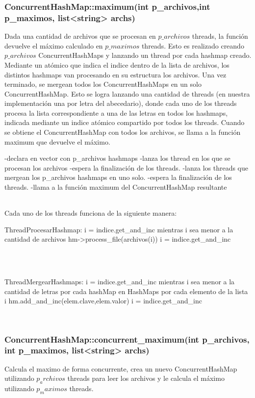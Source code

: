 \subsubsection{ConcurrentHashMap::maximum(int p\_archivos,int p_maximos,
 list<string> archs)}
Dada una cantidad de archivos que se procesan en $p\_archivos$ threads, la función devuelve el máximo calculado en $p\_maximos$ threads.
Esto es realizado creando $p\_archivos$ ConcurrentHashMaps y lanzando un thread por cada hashmap creado.
Mediante un atómico que indica el indice dentro de la lista de archivos, los distintos hashmaps van procesando en su estructura los archivos.
Una vez terminado, se mergean todos los ConcurrentHashMaps en un solo ConcurrentHashMap. Esto se logra lanzando una cantidad de threads (en nuestra implementación una por letra del abecedario), donde cada uno de los threads procesa la lista correspondiente a una de las letras en todos los hashmaps, indicada mediante un indice atómico compartido por todos los threads.
Cuando se obtiene el ConcurrentHashMap con todos los archivos, se llama a la función maximum que devuelve el máximo.\\
\begin{codesnippet}
 	-declara en vector con p_archivos hashmaps
 	-lanza los thread en los que se procesan los archivos
 	-espera la finalización de los threads.
 	-lanza los threads que mergean los p_archivos hashmaps en uno solo.
 	-espera la finalización de los threads.
 	-llama a la función maximum del ConcurrentHashMap resultante
\end{codesnippet}\\
Cada uno de los threads funciona de la siguiente manera:\\
\begin{codesnippet}
 	ThreadProcesarHashmap:
 		i = indice.get_and_inc
 		mientras i sea menor a la cantidad de archivos
 			hm->process_file(archivos(i))
 			i = indice.get_and_inc

\end{codesnippet}\\
\\
\begin{codesnippet}
 	ThreadMergearHashmaps:
 		i = indice.get_and_inc
 		mientras i sea menor a la cantidad de letras
 			por cada hashMap en HashMaps
 				por cada elemento de la lista i
 					hm.add_and_inc(elem.clave,elem.valor)
 			i = indice.get_and_inc
\end{codesnippet}\\

\subsubsection{ConcurrentHashMap::concurrent_maximum(int p_archivos, int p_maximos,
list<string> archs)}
Calcula el maximo de forma concurrente, crea un nuevo ConcurrentHashMap utilizando $p_archivos$ threads para leer los archivos y le calcula el máximo utilizando $p_maximos$ threads.

